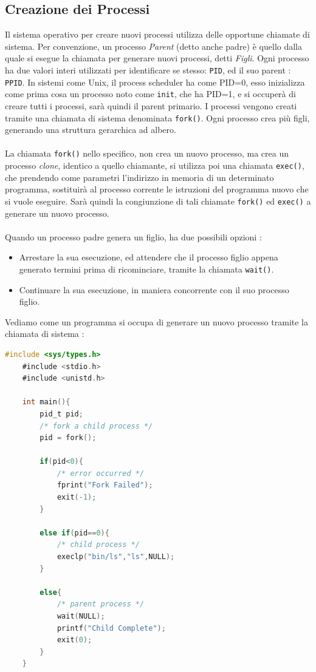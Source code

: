 \documentclass[12pt, letterpaper]{article}
\newcommand{\code}[1]{\colorbox{light-gray}{\texttt{#1}}}
\begin{document}
\subsection{Creazione dei Processi}
Il sistema operativo per creare nuovi processi utilizza delle opportune chiamate di sistema. Per convenzione, 
un processo \textit{Parent} (detto anche padre) è quello dalla quale si esegue la chiamata per generare nuovi processi, detti 
\textit{Figli}. Ogni processo ha due valori interi utilizzati per identificare se stesso: \code{PID}, ed 
il suo parent : \code{PPID}. In sistemi come Unix, il process scheduler ha come PID=0, esso inizializza 
come prima cosa un processo noto come \code{init}, che ha PID=1, e si occuperà di creare tutti i processi, sarà 
quindi il parent primario. I processi vengono creati tramite una chiamata di sistema denominata \code{fork()}.
Ogni processo crea più figli, generando una struttura gerarchica ad albero.\\
\hphantom{}\\ La chiamata \code{fork()} nello 
specifico, non crea un nuovo processo, ma crea un processo \textit{clone}, identico a quello chiamante, si utilizza 
poi una chiamata \code{exec()}, che prendendo come parametri l'indirizzo in memoria di un determinato programma, 
sostituirà al processo corrente le istruzioni del programma nuovo che si vuole eseguire. Sarà quindi la congiunzione 
di tali chiamate \code{fork()} ed \code{exec()} a generare un nuovo processo.
\\\hphantom{}\\ 
Quando un processo padre genera un figlio, ha due possibili opzioni :\begin{itemize}
    \item Arrestare la sua esecuzione, ed attendere che il processo figlio appena generato termini prima di ricominciare,
    tramite la chiamata \code{wait()}.
    \item Continuare la sua esecuzione, in maniera concorrente con il suo processo figlio.
\end{itemize}
Vediamo come un programma si occupa di generare un nuovo processo tramite la chiamata di sistema :\newpage
\begin{lstlisting}[language=C]
    #include <sys/types.h>
    #include <stdio.h>
    #include <unistd.h>
    
    int main(){
        pid_t pid;
        /* fork a child process */
        pid = fork();

        if(pid<0){
            /* error occurred */
            fprint("Fork Failed");
            exit(-1);
        }

        else if(pid==0){
            /* child process */
            execlp("bin/ls","ls",NULL);
        }

        else{
            /* parent process */
            wait(NULL);
            printf("Child Complete");
            exit(0);
        }
    }
\end{lstlisting}
\end{document}
